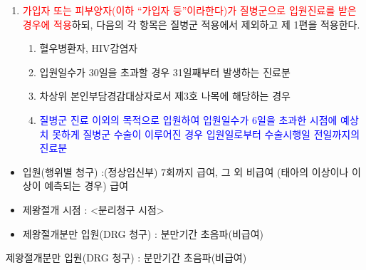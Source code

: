 \clearpage
\begin{myshadowbox}
\begin{enumerate}[2.]\tightlist
\item \textcolor{red}{가입자 또는 피부양자(이하 “가입자 등”이라한다)가 질병군으로 입원진료를 받은 경우에 적용}하되, 다음의 각 항목은 질병군 적용에서 제외하고 제 1편을 적용한다.
	\begin{enumerate}[가.]\tightlist
	\item 혈우병환자, HIV감염자
	\item 입원일수가 30일을 초과할 경우 31일째부터 발생하는 진료분
	\item 차상위 본인부담경감대상자로서 제3호 나목에 해당하는 경우
	\item \textcolor{blue}{질병군 진료 이외의 목적으로 입원하여 입원일수가 6일을 초과한 시점에 예상치 못하게 질병군 수술이 이루어진 경우 입원일로부터 수술시행일 전일까지의 진료분}
	\end{enumerate}
\end{enumerate}
\prezi{\clearpage}
\end{myshadowbox}
\par
\medskip
\prezi{\clearpage}
\Ans
{\begin{itemize}\tightlist
\item 입원(행위별 청구) :(정상임신부) 7회까지 급여, 그 외 비급여 (태아의 이상이나 이상이 예측되는 경우) 급여
\item 제왕절개 시점 : <분리청구 시점>%
\item 제왕절개분만 입원(DRG 청구) : 분만기간 초음파(비급여)
\end{itemize}}
\par
\medskip
\prezi{\clearpage}
\Ans
{제왕절개분만 입원(DRG 청구) : 분만기간 초음파(비급여)}
\prezi{\clearpage}


